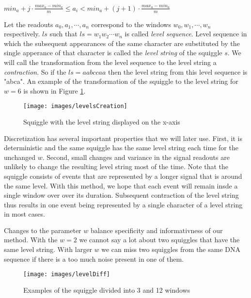 \begin{center}
$min_a + j\cdot \frac{max_a-min_a}{m} \leq a_i < min_a + (j+1)\cdot \frac{max_a-min_a}{m}$
\end{center}

Let the readouts $a_0, a_1, \cdots, a_n$ correspond to the windows $w_0, w_1, \cdots ,w_n$
respectively. $ls$ such that $ls=w_1w_2\cdots w_n$ is called \textit{level sequence}.
Level sequence in which the subsequent appearances of the same character are substituted
by the single apperance of that character is called the \textit{level string} of the squiggle $s$.
We will call the transformation from the level sequence to the level string a \textit{contraction}.
So if the $ls=aabccaa$ then the level string from this level sequence is "abca". An example of the transformation
of the squiggle to the level string for $w=6$ is shown in Figure \ref{obr:levelsCreation}.

\begin{figure}
\centerline{\texttt{[image: images/levelsCreation]}}
\caption[TODO]{Squiggle with the level string displayed on the x-axis}
\label{obr:levelsCreation}
\end{figure}

Discretization has several important properties that we will later use.
First, it is deterministic and the same squiggle has the same level
string each time for the unchanged $w$. Second, small changes and variance in the signal readouts
are unlikely to change the resulting level string most of the time. Note that the squiggle
consists of events that are represented by a longer signal that is around the same level.
With this method, we hope that each event will remain insde a single window over over its
duration. Subsequent contraction of the level string thus results in one event being represented by
a single character of a level string in most cases.

Changes to the parameter $w$ balance specificity and informativness of our method.
With the $w=2$ we cannot say a lot about two squiggles that have the same level string.
With larger $w$ we can miss two squiggles from the same DNA sequence if there is
a too much noise present in one of them.

\begin{figure}
\centerline{\texttt{[image: images/levelDiff]}}
\caption[TODO]{Examples of the squiggle divided into 3 and 12 windows}
\label{obr:levelDiff}
\end{figure}

